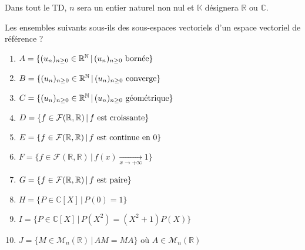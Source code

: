 \documentclass[a4paper,twoside,french,11pt]{VcCours}
\begin{document}

\tableofcontents
\separationTitre

Dans tout le TD, $n$ sera un entier naturel non nul et $\mathbb{K}$ désignera $\mathbb{R}$ ou $\mathbb{C}$.

\medskip


\begin{Exercice}{} Les ensembles suivants sous-ils des sous-espaces vectoriels d'un espace vectoriel de référence ?

\begin{multicols}{2}
\begin{small}
\begin{enumerate}
\item $A = \lbrace (u_n)_{n \geq 0} \in \mathbb{R}^{\mathbb{N}} \, \vert \, (u_n)_{n \geq 0} \hbox{ bornée} \rbrace $
\item $B = \lbrace (u_n)_{n \geq 0} \in \mathbb{R}^{\mathbb{N}} \, \vert \, (u_n)_{n \geq 0} \hbox{ converge} \rbrace $
\item $C = \lbrace (u_n)_{n \geq 0} \in \mathbb{R}^{\mathbb{N}} \, \vert \, (u_n)_{n \geq 0} \hbox{ géométrique} \rbrace $
\item $D = \lbrace f \in \mathcal{F}(\mathbb{R}, \mathbb{R}) \, \vert \, f \hbox{ est croissante} \rbrace$
\item $E = \lbrace f \in \mathcal{F}(\mathbb{R}, \mathbb{R}) \, \vert \, f \hbox{ est continue en 0} \rbrace$
\columnbreak
\item $F = \lbrace f \in \mathcal{F}(\mathbb{R}, \mathbb{R}) \, \vert \, f(x) \underset{ x \rightarrow + \infty}{\rightarrow} 1 \rbrace$
\item $G= \lbrace f \in \mathcal{F}(\mathbb{R}, \mathbb{R}) \, \vert \, f \hbox{ est paire} \rbrace$
\item $H= \lbrace P \in \mathbb{C}[X] \, \vert \, P(0)=1  \rbrace$
\item $I= \lbrace P \in \mathbb{C}[X] \, \vert \, P(X^2)=(X^2+1)P(X)  \rbrace$
\item $J= \lbrace M \in \mathcal{M}_n(\mathbb{R}) \, \vert \, AM=MA \rbrace$ où $A \in \mathcal{M}_n(\mathbb{R})$
\end{enumerate}
\end{small}
\end{multicols}
\end{Exercice}
\end{document}
